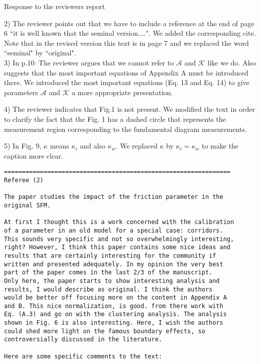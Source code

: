 \documentclass[a4paper,12pt]{letter}
\begin{document}
\begin{letter}{Response to the reviewers report}
{2) The reviewer points out that we have to include a reference at the end of 
page 6 ``it is well known that the seminal version....". 
We added the corresponding cite. Note that in the revised version this text is in page 7 and we replaced the word ``seminal" by ``original".   \\

3) In p.10: The reviewer argues that we cannot refer to $\mathcal{A}$ and $\mathcal{K}$ like we do. Also suggests that the most important equations of Appendix A must be introduced there. We introduced the most important equations (Eq. 13 and Eq. 14) to give parameters $\mathcal{A}$ and $\mathcal{K}$ a more appropriate presentation. 

4) The reviewer indicates that Fig.1 is not present. We modified the text in order to clarify the fact that the Fig. 1 has a 
dashed circle that represents the measurement region corresponding to the fundamental diagram measurements. 

5) In Fig. 9, $\kappa$ means $\kappa_i$ and also $\kappa_w$. We replaced $\kappa$ by $\kappa_i = \kappa_w$ to make the caption more clear.   


}

\newpage

\begin{verbatim}
===============================================================
Referee (2)

The paper studies the impact of the friction parameter in the 
original SFM.

At first I thought this is a work concerned with the calibration 
of a parameter in an old model for a special case: corridors. 
This sounds very specific and not so overwhelmingly interesting,
right? However, I think this paper contains some nice ideas and 
results that are certainly interesting for the community if 
written and presented adequately. In my opinion the very best 
part of the paper comes in the last 2/3 of the manuscript.
Only here, the paper starts to show interesting analysis and 
results, I would describe as original. I think the authors 
would be better off focusing more on the content in Appendix A
and B. This nice normalization, is good. from there work with 
Eq. (A.3) and go on with the clustering analysis. The analysis 
shown in Fig. 6 is also interesting. Here, I wish the authors 
could shed more light on the famous boundary effects, so
controversially discussed in the literature.

Here are some specific comments to the text:


\end{verbatim}
\end{letter}
\end{document}
